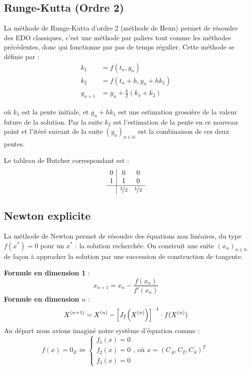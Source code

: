 \documentclass[12pt]{article}
\theoremstyle{saav}
\newcommand{\parr}[1]{\hspace{-0.05cm}\left(#1 \right)}
\newcommand{\rect}[1]{\left[ #1 \right]}
\newcommand{\mb}[1]{\mathbb{#1}}
\begin{document}
		\subsection{Runge-Kutta (Ordre 2)}
			La méthode de Runge-Kutta d'ordre 2 (méthode de Heun) permet de résoudre des EDO classiques, c'est une méthode par paliers tout comme les méthodes précédentes, donc qui fonctionne par pas de temps régulier.  
			Cette méthode se définie par : 
			\begin{align*}
				k_{1}&= f(t_{n},y_{n})
				\\
				k_{2}&= f(t_{n} + h, y_{n} + hk_{1})
				\\
				y_{n+1} &= y_{n} + \frac{h}{2}(k_{1} + k_{2})
			\end{align*}
			
			où $k_{1}$ est la pente initiale, et $y_{n} + hk_{1}$ est une estimation grossière de la valeur future de la solution. Par la suite $k_{2}$ est l'estimation de la pente en ce nouveau point et l'itéré suivant de la suite $(y_{n})_{n \in \mb{N}}$ est la combinaison de ces deux pentes.
			
			Le tableau de Butcher correspondant est : 
			 \[
			 \begin{array}{c|cc}
			 	0 & 0 & 0 \\
			 	1 & 1 & 0 \\
			 	\hline
			 	& \nicefrac{1}{2} & \nicefrac{1}{2}
			 \end{array}
			 \]
			 	 
		
		\subsection{Newton explicite}
		La méthode de Newton permet de résoudre des équations non linéaires, du type $f(x^*)=0$ pour un $x^*$ : la solution recherchée. On construit une suite $(x_{n})_{n \in \mb{N}}$ de façon à approcher la solution par une succession de construction de tangente. 
		
		
			\textbf{Formule en dimension 1 }: 
			\begin{equation}
				x_{n+1} = x_{n} - 	\dfrac{f(x_{n})}{f'(x_{n})}
			\end{equation}
			\textbf{Formule en dimension $n$ }: 
			\begin{equation*}
				X^{(n+1)} = X^{(n)} - 	\rect{J_{f}\parr{X^{(n)}}}^{-1}\cdot f(X^{(n)})
			\end{equation*}
			Au départ nous avions imaginé notre système d'équation comme : 
			\begin{equation*}
				f(x) = 0_{E} \iff \begin{cases}
					f_{1}(x)=0\\
					f_{2}(x)=0\\
					f_{3}(x)=0
				\end{cases} \text{, où $x = (C_{A},C_{T},C_{S})^{T}$ }
			\end{equation*}
			
\end{document}
